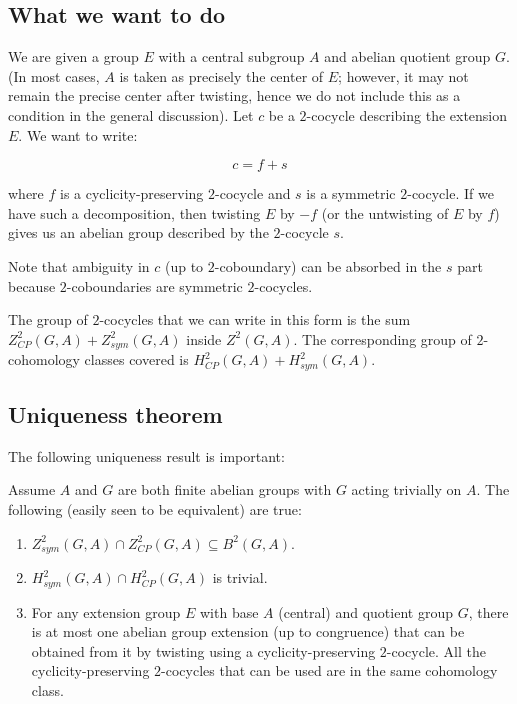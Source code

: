 \documentclass[10pt]{amsart}
\begin{document}
\subsection{What we want to do}

We are given a group $E$ with a central subgroup $A$ and abelian
quotient group $G$. (In most cases, $A$ is taken as precisely the
center of $E$; however, it may not remain the precise center after
twisting, hence we do not include this as a condition in the general
discussion). Let $c$ be a $2$-cocycle describing the extension $E$. We
want to write:

$$c = f + s$$

where $f$ is a cyclicity-preserving $2$-cocycle and $s$ is a symmetric
$2$-cocycle. If we have such a decomposition, then twisting $E$ by
$-f$ (or the untwisting of $E$ by $f$) gives us an abelian group
described by the $2$-cocycle $s$.

Note that ambiguity in $c$ (up to $2$-coboundary) can be absorbed in
the $s$ part because $2$-coboundaries are symmetric $2$-cocycles.

The group of $2$-cocycles that we can write in this form is the sum
$Z^2_{CP}(G,A) + Z^2_{sym}(G,A)$ inside $Z^2(G,A)$. The corresponding
group of $2$-cohomology classes covered is $H^2_{CP}(G,A) +
H^2_{sym}(G,A)$.

\subsection{Uniqueness theorem}

The following uniqueness result is important:

\begin{theorem}\label{uniqueness}
  Assume $A$ and $G$ are both finite abelian groups with $G$ acting
  trivially on $A$. The following (easily seen to be equivalent) are
  true:
  \begin{enumerate}
  \item $Z^2_{sym}(G,A) \cap Z^2_{CP}(G,A) \subseteq B^2(G,A)$.
  \item $H^2_{sym}(G,A) \cap H^2_{CP}(G,A)$ is trivial.
  \item For any extension group $E$ with base $A$ (central) and
    quotient group $G$, there is at most one abelian group extension
    (up to congruence) that can be obtained from it by twisting using
    a cyclicity-preserving $2$-cocycle. All the cyclicity-preserving
    $2$-cocycles that can be used are in the same cohomology class.
  \end{enumerate}
\end{theorem}
\end{document}
